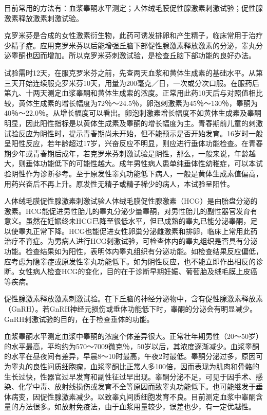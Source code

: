 \documentclass[12pt,UTF8,openany]{ctexbook}
\begin{document}
目前常用的方法有：血浆睾酮水平测定；人体绒毛膜促性腺激素刺激试验；促性腺激素释放激素刺激试验。

克罗米芬是合成的女性激素衍生物，此药可诱发排卵和产生精子，临床常用于治疗少精子症。应用克罗米芬以后能增强丘脑下部促性腺激素释放激素的分泌，睾丸分泌睾酮也因而增加。所以克罗米芬刺激试验，是检查丘脑下部功能的良好办法。

试验需时12天，在服克罗米芬之前，先查两天血浆和黄体生成素的基础水平。从第三天开始连续服克罗米芬10天，用量为200毫克／日，一次或分次口服。在服药后第九、十两天测定血浆睾酮和黄体生成索的浓度。正常用此药10天后与对照值相比较，黄体生成素的增长幅度为72％～24.5％，卵泡刺激素为45％～130％，睾酮为40％～22.0％。从增长幅度可以看出。卵泡刺激素增长幅度不如黄体生成素及睾酮明显，因此阳性指标是以黄体生成素及睾酮的增长幅度为主。青春期前儿童的刺激试验反应为阴性时，提示青春期尚未开始，但不能预示是否开始发育。16岁时一般呈阳性反应，若年龄超过17岁，兴奋反应不明显，则应进行垂体功能检查。在青春期少年或青春期后成年，若克罗米芬刺激试验是阴性，那么，一般来说，年龄越大，则垂体功能低下的可能性越大。成年男性病人患单纯垂体性幼稚症，可以本试验阴性作为诊断参考。至于原发性睾丸功能低下病人，一般是黄体生成素值偏高，用药兴奋后不再上升。原发性无精子或精子稀少的病人，本试验呈阳性。

人体绒毛膜促性腺激素刺激试验人体绒毛膜促性腺激素（HCG）是由胎盘分泌的激素。HCG能促进男性胎儿的睾丸分泌少量睾酮，对男性胎儿的副性器官发育有意义。虽然在妊娠终未HCG已降至很低水平，但已成熟的睾丸已能分泌睾酮，足以使睾丸正常下降。HCG也能促进女性卵巢分泌雌激素和排卵，临床上常用此药治疗不育症。为男病人进行HCG刺激试验，可检查体内的睾丸组织是否具有分泌功能。检查结果如为阳性，表明体内睾丸组织有分泌功能。如检查结果反应偏低，应考虑为隐睾症或原发性睾丸功能低下。如为阴性反应，也不能立即作出相反的诊断。女性病人检查HCG的变化，目的在于诊断早期妊娠、葡萄胎及绒毛膜上皮癌等疾病。

促性腺激素释放激素刺激试验。在下丘脑的神经分泌物中，含有促性腺激素释放素（GnRH）。若GnRH神经元损伤或垂体功能低下时，睾酮的分泌会有明显减少。GnRH刺激试验的目的，在于检查垂体的功能。

血浆睾酮水平测定血浆中睾酮的浓度个体差异很大。正常壮年期男性（20～50岁）的水平最高，平均约为570～7009微克％，50岁以后，其浓度逐渐减少。血浆睾酮的水平在昼夜间有差异，早晨8～10时最高，午夜2时最低。睾酮分泌过多，原因可为睾丸的良性问质细胞瘤，血浆睾酮比正常人多100倍，因而表现为肌肉和骨骼的生长过快，性器官过早发育和副性征过早出现。睾酮分泌不足，可见于因手术、感染、化学中毒、放射线损伤或发育不全等原因而致睾丸功能低下。也可能继发于垂体病变，因促性腺激素减少。以致睾丸间质细胞发育不良。目前测定血浆中睾酮含量的方法很多。如放射免疫法，由于血浆用量较少，误差也少，有一定优越性。
\end{document}
